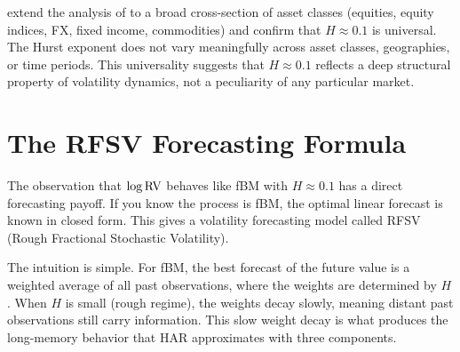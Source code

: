 \begin{keyresult}
\citet{BLP2022} extend the analysis of \citet{GJR2018} to a broad cross-section of asset classes (equities, equity indices, FX, fixed income, commodities) and confirm that $H \approx 0.1$ is universal.
The Hurst exponent does not vary meaningfully across asset classes, geographies, or time periods.
This universality suggests that $H \approx 0.1$ reflects a deep structural property of volatility dynamics, not a peculiarity of any particular market.
\end{keyresult}


\section{The RFSV Forecasting Formula}
\label{sec:rfsv}

The observation that $\log \operatorname{RV}$ behaves like fBM with $H \approx 0.1$ has a direct forecasting payoff.
If you know the process is fBM, the optimal linear forecast is known in closed form.
This gives a volatility forecasting model called RFSV (Rough Fractional Stochastic Volatility).

The intuition is simple.
For fBM, the best forecast of the future value is a weighted average of all past observations, where the weights are determined by $H$.
When $H$ is small (rough regime), the weights decay slowly, meaning distant past observations still carry information.
This slow weight decay is what produces the long-memory behavior that HAR approximates with three components.


